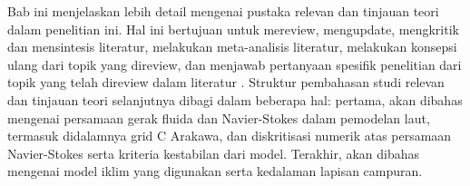 \vspace{1.5pc}
\begin{spacing}{1.5}
	
	Bab ini menjelaskan lebih detail mengenai pustaka relevan dan tinjauan teori dalam penelitian ini. Hal ini bertujuan untuk mereview, mengupdate, mengkritik dan mensintesis literatur, melakukan meta-analisis literatur, melakukan konsepsi ulang dari topik yang direview, dan menjawab pertanyaan spesifik penelitian dari topik yang telah direview dalam literatur . Struktur pembahasan studi relevan dan tinjauan teori selanjutnya dibagi dalam beberapa hal: pertama, akan dibahas mengenai persamaan gerak fluida dan Navier-Stokes dalam pemodelan laut, termasuk didalamnya grid C Arakawa, dan diskritisasi numerik atas persamaan Navier-Stokes serta kriteria kestabilan dari model. Terakhir, akan dibahas mengenai model iklim yang digunakan serta kedalaman lapisan campuran.
	
	
\end{spacing}
\vspace{-0.1pc}
